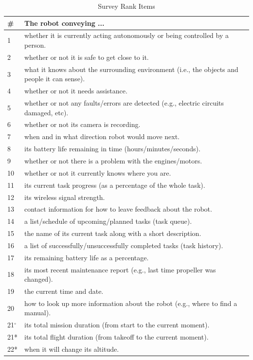 \documentclass[letterpaper, 10 pt, conference]{ieeeconf}  %
\begin{document}
\begin {table}
\begin{center}
\caption{Survey Rank Items}
\label{table:itemslist}
\vspace{1em}
\begin{tabular}{|p{8pt} | p{215.6pt} |}
 \hline
 \# & The robot conveying ... \\
 \hline
1 & whether it is currently acting autonomously or being controlled by a person.\\
\hline
2 &  whether or not it is safe to get close to it.\\
\hline
3 &  what it knows about the surrounding environment (i.e., the objects and people it can sense).\\
\hline
4 &  whether or not it needs assistance.\\
\hline
5 &  whether or not any faults/errors are detected (e.g., electric circuits damaged, etc).\\
\hline
6 &  whether or not its camera is recording.\\
\hline
7 &  when and in what direction robot would move next.\\
\hline
8 &  its battery life remaining in time (hours/minutes/seconds).\\
\hline
9 &  whether or not there is a problem with the engines/motors.\\
\hline
10 &  whether or not it currently knows where you are.\\
\hline
11 &  its current task progress (as a percentage of the whole task).\\
\hline
12 &  its wireless signal strength.\\
\hline
13 &  contact information for how to leave feedback about the robot.\\
\hline
14 &  a list/schedule of upcoming/planned tasks (task queue).\\
\hline
15 &  the name of its current task along with a short description.\\
\hline
16 &  a list of successfully/unsuccessfully completed tasks (task history).\\
\hline
17 &  its remaining battery life as a percentage.\\
\hline
18 &  its most recent maintenance report (e.g., last time propeller was changed).\\
\hline
19 &  the current time and date.\\
\hline
20 &  how to look up more information about the robot (e.g., where to find a manual).\\
\hline
21$^{\circ}$ & its total mission duration (from start to the current moment).\\
\hline
21* &  its total flight duration (from takeoff to the current moment).\\
\hline
22* &  when it will change its altitude.\\
\hline


\end{tabular}
\end{center}
\end{table}
\end{document}
